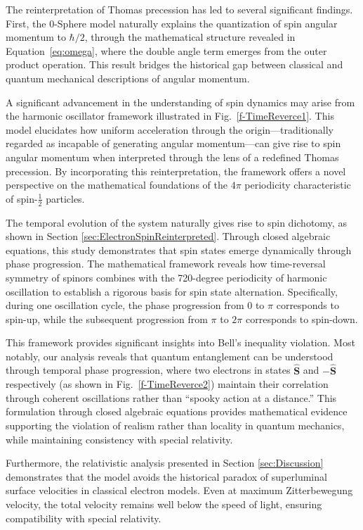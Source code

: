 \documentclass[%
 reprint,
 amsmath,amssymb,
 aps,
]{revtex4-1}
\numberwithin{equation}{section}%
\begin{document}
The reinterpretation of Thomas precession has led to several significant findings. First, the 0-Sphere model naturally explains the quantization of spin angular momentum to $\hbar/2$, through the mathematical structure revealed in Equation~\ref{eq:omega}, where the double angle term emerges from the outer product operation. This result bridges the historical gap between classical and quantum mechanical descriptions of angular momentum.

A significant advancement in the understanding of spin dynamics may arise from the harmonic oscillator framework illustrated in Fig.~\ref{f-TimeReverce1}. This model elucidates how uniform acceleration through the origin—traditionally regarded as incapable of generating angular momentum—can give rise to spin angular momentum when interpreted through the lens of a redefined Thomas precession. By incorporating this reinterpretation, the framework offers a novel perspective on the mathematical foundations of the $4\pi$ periodicity characteristic of spin-$\frac{1}{2}$ particles.

The temporal evolution of the system naturally gives rise to spin dichotomy, as shown in Section \ref{sec:ElectronSpinReinterpreted}. Through closed algebraic equations, this study demonstrates that spin states emerge dynamically through phase progression. The mathematical framework reveals how time-reversal symmetry of spinors combines with the 720-degree periodicity of harmonic oscillation to establish a rigorous basis for spin state alternation. Specifically, during one oscillation cycle, the phase progression from $0$ to $\pi$ corresponds to spin-up, while the subsequent progression from $\pi$ to $2\pi$ corresponds to spin-down.

This framework provides significant insights into Bell's inequality violation. Most notably, our analysis reveals that quantum entanglement can be understood through temporal phase progression, where two electrons in states $\hat{\boldsymbol{S}}$ and $-\hat{\boldsymbol{S}}$ respectively (as shown in Fig.~\ref{f-TimeReverce2}) maintain their correlation through coherent oscillations rather than ``spooky action at a distance.'' This formulation through closed algebraic equations provides mathematical evidence supporting the violation of realism rather than locality in quantum mechanics, while maintaining consistency with special relativity.

Furthermore, the relativistic analysis presented in Section \ref{sec:Discussion} demonstrates that the model avoids the historical paradox of superluminal surface velocities in classical electron models. Even at maximum Zitterbewegung velocity, the total velocity remains well below the speed of light, ensuring compatibility with special relativity.
\end{document}

